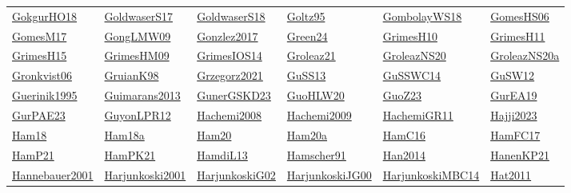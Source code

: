 \begin{longtable}{*{6}{l}}
\hyperref[detail:GokgurHO18]{GokgurHO18} & \hyperref[detail:GoldwaserS17]{GoldwaserS17} & \hyperref[detail:GoldwaserS18]{GoldwaserS18} & \hyperref[detail:Goltz95]{Goltz95} & \hyperref[detail:GombolayWS18]{GombolayWS18} & \hyperref[detail:GomesHS06]{GomesHS06}\\ 
\hyperref[detail:GomesM17]{GomesM17} & \hyperref[detail:GongLMW09]{GongLMW09} & \hyperref[detail:Gonzlez2017]{Gonzlez2017} & \hyperref[detail:Green24]{Green24} & \hyperref[detail:GrimesH10]{GrimesH10} & \hyperref[detail:GrimesH11]{GrimesH11}\\ 
\hyperref[detail:GrimesH15]{GrimesH15} & \hyperref[detail:GrimesHM09]{GrimesHM09} & \hyperref[detail:GrimesIOS14]{GrimesIOS14} & \hyperref[detail:Groleaz21]{Groleaz21} & \hyperref[detail:GroleazNS20]{GroleazNS20} & \hyperref[detail:GroleazNS20a]{GroleazNS20a}\\ 
\hyperref[detail:Gronkvist06]{Gronkvist06} & \hyperref[detail:GruianK98]{GruianK98} & \hyperref[detail:Grzegorz2021]{Grzegorz2021} & \hyperref[detail:GuSS13]{GuSS13} & \hyperref[detail:GuSSWC14]{GuSSWC14} & \hyperref[detail:GuSW12]{GuSW12}\\ 
\hyperref[detail:Guerinik1995]{Guerinik1995} & \hyperref[detail:Guimarans2013]{Guimarans2013} & \hyperref[detail:GunerGSKD23]{GunerGSKD23} & \hyperref[detail:GuoHLW20]{GuoHLW20} & \hyperref[detail:GuoZ23]{GuoZ23} & \hyperref[detail:GurEA19]{GurEA19}\\ 
\hyperref[detail:GurPAE23]{GurPAE23} & \hyperref[detail:GuyonLPR12]{GuyonLPR12} & \hyperref[detail:Hachemi2008]{Hachemi2008} & \hyperref[detail:Hachemi2009]{Hachemi2009} & \hyperref[detail:HachemiGR11]{HachemiGR11} & \hyperref[detail:Hajji2023]{Hajji2023}\\ 
\hyperref[detail:Ham18]{Ham18} & \hyperref[detail:Ham18a]{Ham18a} & \hyperref[detail:Ham20]{Ham20} & \hyperref[detail:Ham20a]{Ham20a} & \hyperref[detail:HamC16]{HamC16} & \hyperref[detail:HamFC17]{HamFC17}\\ 
\hyperref[detail:HamP21]{HamP21} & \hyperref[detail:HamPK21]{HamPK21} & \hyperref[detail:HamdiL13]{HamdiL13} & \hyperref[detail:Hamscher91]{Hamscher91} & \hyperref[detail:Han2014]{Han2014} & \hyperref[detail:HanenKP21]{HanenKP21}\\ 
\hyperref[detail:Hannebauer2001]{Hannebauer2001} & \hyperref[detail:Harjunkoski2001]{Harjunkoski2001} & \hyperref[detail:HarjunkoskiG02]{HarjunkoskiG02} & \hyperref[detail:HarjunkoskiJG00]{HarjunkoskiJG00} & \hyperref[detail:HarjunkoskiMBC14]{HarjunkoskiMBC14} & \hyperref[detail:Hat2011]{Hat2011}\\ 

\end{longtable}
